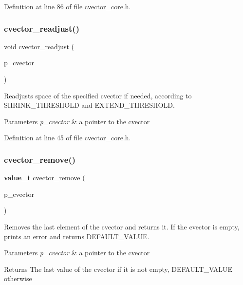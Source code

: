 Definition at line 86 of file cvector\+\_\+core.\+h.

\mbox{\label{cvector__core_8h_a9461750aa0be3a7104fca3ea80ea26e2}} 
\subsubsection{cvector\+\_\+readjust()}
{\footnotesize\ttfamily void cvector\+\_\+readjust (\begin{DoxyParamCaption}\item[{\textbf{ cvector} $\ast$}]{p\+\_\+cvector }\end{DoxyParamCaption})}

Readjusts space of the specified cvector if needed, according to S\+H\+R\+I\+N\+K\+\_\+\+T\+H\+R\+E\+S\+H\+O\+LD and E\+X\+T\+E\+N\+D\+\_\+\+T\+H\+R\+E\+S\+H\+O\+LD. 
\begin{DoxyParams}{Parameters}
{\em p\+\_\+cvector} & a pointer to the cvector \\
\hline
\end{DoxyParams}


Definition at line 45 of file cvector\+\_\+core.\+h.

\mbox{\label{cvector__core_8h_a7af2a3f3b2e1fd3f2081536a4d73ac2e}} 
\subsubsection{cvector\+\_\+remove()}
{\footnotesize\ttfamily \textbf{ value\+\_\+t} cvector\+\_\+remove (\begin{DoxyParamCaption}\item[{\textbf{ cvector} $\ast$}]{p\+\_\+cvector }\end{DoxyParamCaption})}

Removes the last element of the cvector and returns it. If the cvector is empty, prints an error and returns D\+E\+F\+A\+U\+L\+T\+\_\+\+V\+A\+L\+UE. 
\begin{DoxyParams}{Parameters}
{\em p\+\_\+cvector} & a pointer to the cvector \\
\hline
\end{DoxyParams}
\begin{DoxyReturn}{Returns}
The last value of the cvector if it is not empty, D\+E\+F\+A\+U\+L\+T\+\_\+\+V\+A\+L\+UE otherwise 
\end{DoxyReturn}



